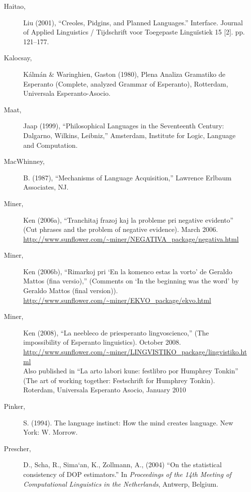\documentclass[10pt,a4paper]{article}
\begin{document}
\begin{description}
\item[Haitao,] Liu (2001), ``Creoles, Pidgins, and Planned Languages.'' Interface.
Journal of Applied Linguistics / Tijdschrift voor Toegepaste Linguïstiek 15 [2]. pp. 121--177.

\item[Kalocsay,] K\'alm\'an \& Waringhien, Gaston (1980), Plena Analiza Gramatiko de
Esperanto (Complete, analyzed Grammar of Esperanto), Rotterdam, Universala
Esperanto-Asocio.

\item[Maat,] Jaap (1999), ``Philosophical Languages in the Seventeenth Century:
Dalgarno, Wilkins, Leibniz,'' Amsterdam, Institute for Logic, Language and
Computation.

\item[MacWhinney,] B. (1987), ``Mechanisms of Language Acquisition,'' Lawrence Erlbaum Associates, NJ.

\item[Miner,] Ken (2006a), ``Tranchitaj frazoj kaj la probleme pri negative
evidento'' (Cut phrases and the problem of negative evidence). March 2006. \\
\url{http://www.sunflower.com/~miner/NEGATIVA_package/negativa.html}

\item[Miner,] Ken (2006b), ``Rimarkoj pri `En la komenco estas la vorto' de Geraldo
Mattos (fina versio),'' (Comments on `In the beginning was the word' by Geraldo
Mattos (final version)). \\
\url{http://www.sunflower.com/~miner/EKVO_package/ekvo.html}

\item[Miner,] Ken (2008), ``La neebleco de priesperanto lingvoscienco,'' (The
impossibility of Esperanto linguistics). October 2008. \\
\url{http://www.sunflower.com/~miner/LINGVISTIKO_package/lingvistiko.html} \\
Also published in ``La arto labori kune: festlibro por Humphrey Tonkin'' (The
art of working together: Festschrift for Humphrey Tonkin). Roterdam, Universala
Esperanto Asocio, January 2010

\item[Pinker,] S. (1994). The language instinct: How the mind creates language. New York: W. Morrow.

\item[Prescher,] D., Scha, R., Sima`an, K., Zollmann, A., (2004) ``On the statistical
consistency of DOP estimators.'' In {\em Proceedings of the 14th Meeting of
Computational Linguistics in the Netherlands}, Antwerp, Belgium.


\end{description}
\end{document}
